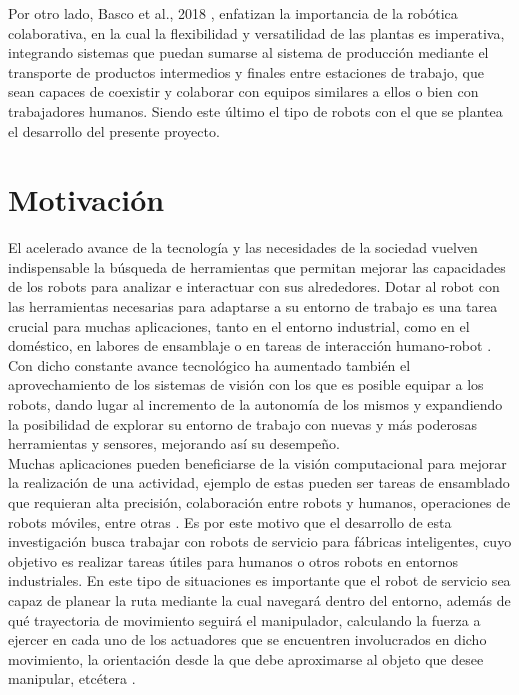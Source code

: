 Por otro lado, Basco et al., 2018 \cite{basco_industria_2018}, enfatizan la importancia de la robótica colaborativa, en la cual la flexibilidad y versatilidad de las plantas es imperativa, integrando sistemas que puedan sumarse al sistema de producción  mediante el transporte de productos intermedios y finales entre estaciones de trabajo, que sean capaces de coexistir y colaborar con equipos similares a ellos o bien con trabajadores humanos. Siendo este último el tipo de robots con el que se plantea el desarrollo del presente proyecto.
 
\newpage
\section{Motivación}
El acelerado avance de la tecnología y las necesidades de la sociedad vuelven indispensable la búsqueda de herramientas que permitan mejorar las capacidades de los robots para analizar e interactuar con sus alrededores. Dotar al robot con las herramientas necesarias para adaptarse a su entorno de trabajo es una tarea crucial para muchas aplicaciones, tanto en el entorno industrial, como en el doméstico, en labores de ensamblaje o en tareas de interacción humano-robot \cite{roveda_robot_2022}. Con dicho constante avance tecnológico ha aumentado también el aprovechamiento de los sistemas de visión con los que es posible  equipar a los robots, dando lugar al incremento de la autonomía de los mismos y expandiendo la posibilidad de explorar su entorno de trabajo con nuevas y más poderosas herramientas y sensores, mejorando así su desempeño.\\ 

Muchas aplicaciones pueden beneficiarse de la visión computacional para mejorar la realización de una actividad, ejemplo de estas pueden ser tareas de ensamblado que requieran alta precisión, colaboración entre robots y humanos, operaciones de robots móviles, entre otras \cite{ROVEDA2021103711}. Es por este motivo que el desarrollo de esta investigación busca trabajar con robots de servicio para fábricas inteligentes, cuyo objetivo es realizar tareas útiles para humanos o otros robots en entornos industriales. En este tipo de situaciones es importante que el robot de servicio sea capaz de planear la ruta mediante la cual navegará dentro del entorno, además de qué trayectoria de movimiento seguirá el manipulador, calculando la fuerza a ejercer en cada uno de los actuadores que se encuentren involucrados en dicho movimiento, la orientación desde la que debe aproximarse al objeto que desee manipular, etcétera \cite{Rosenbaum2006}.\\

